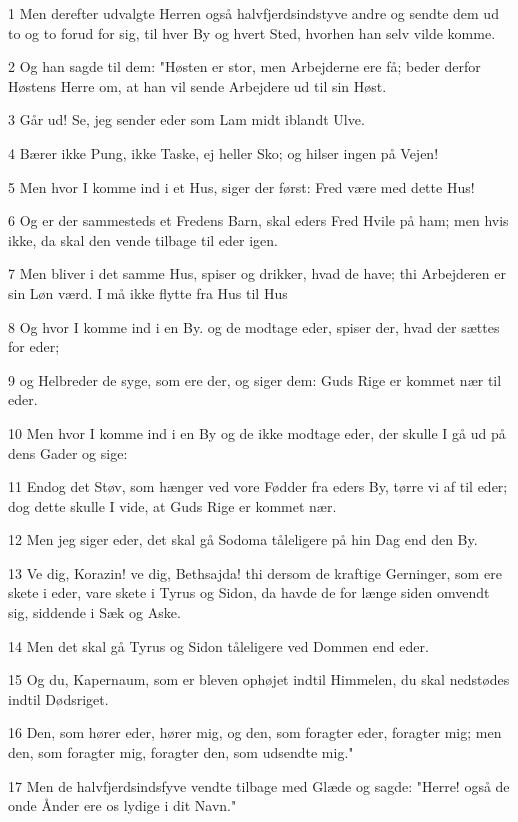 \par 1 Men derefter udvalgte Herren også halvfjerdsindstyve andre og sendte dem ud to og to forud for sig, til hver By og hvert Sted, hvorhen han selv vilde komme.
\par 2 Og han sagde til dem: "Høsten er stor, men Arbejderne ere få; beder derfor Høstens Herre om, at han vil sende Arbejdere ud til sin Høst.
\par 3 Går ud! Se, jeg sender eder som Lam midt iblandt Ulve.
\par 4 Bærer ikke Pung, ikke Taske, ej heller Sko; og hilser ingen på Vejen!
\par 5 Men hvor I komme ind i et Hus, siger der først: Fred være med dette Hus!
\par 6 Og er der sammesteds et Fredens Barn, skal eders Fred Hvile på ham; men hvis ikke, da skal den vende tilbage til eder igen.
\par 7 Men bliver i det samme Hus, spiser og drikker, hvad de have; thi Arbejderen er sin Løn værd. I må ikke flytte fra Hus til Hus
\par 8 Og hvor I komme ind i en By. og de modtage eder, spiser der, hvad der sættes for eder;
\par 9 og Helbreder de syge, som ere der, og siger dem: Guds Rige er kommet nær til eder.
\par 10 Men hvor I komme ind i en By og de ikke modtage eder, der skulle I gå ud på dens Gader og sige:
\par 11 Endog det Støv, som hænger ved vore Fødder fra eders By, tørre vi af til eder; dog dette skulle I vide, at Guds Rige er kommet nær.
\par 12 Men jeg siger eder, det skal gå Sodoma tåleligere på hin Dag end den By.
\par 13 Ve dig, Korazin! ve dig, Bethsajda! thi dersom de kraftige Gerninger, som ere skete i eder, vare skete i Tyrus og Sidon, da havde de for længe siden omvendt sig, siddende i Sæk og Aske.
\par 14 Men det skal gå Tyrus og Sidon tåleligere ved Dommen end eder.
\par 15 Og du, Kapernaum, som er bleven ophøjet indtil Himmelen, du skal nedstødes indtil Dødsriget.
\par 16 Den, som hører eder, hører mig, og den, som foragter eder, foragter mig; men den, som foragter mig, foragter den, som udsendte mig."
\par 17 Men de halvfjerdsindsfyve vendte tilbage med Glæde og sagde: "Herre! også de onde Ånder ere os lydige i dit Navn."

